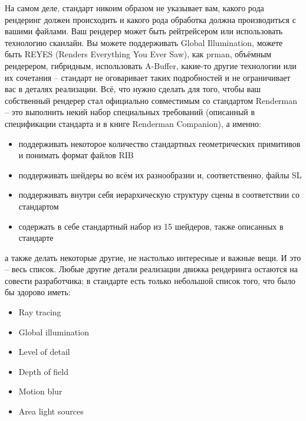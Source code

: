  На самом деле,  стандарт никоим образом не
    указывает вам, какого рода рендеринг должен происходить и какого
    рода обработка должна производиться с вашими файлами. Ваш рендерер
    может быть рейтрейсером или использовать технологию сканлайн. Вы
    можете поддерживать Global Illumination,
    можете быть REYES (Renders Everything You Ever Saw), как prman, объёмным рендерером, гибридным, использовать A-Buffer, какие-то
    другие технологии или их сочетания – стандарт не оговаривает таких
    подробностей и  не
    ограничивает вас в деталях реализации. Всё, что нужно сделать для
    того, чтобы ваш собственный рендерер стал официально совместимым со
    стандартом Renderman – это
    выполнить некий набор специальных требований (описанный в
    спецификации стандарта и в книге Renderman Companion), а
    именно:
  
\begin{itemize}

\item поддерживать некоторое количество стандартных геометрических примитивов и понимать формат файлов RIB

\item поддерживать шейдеры во всём их разнообразии и, соответственно, файлы SL

\item поддерживать внутри себя иерархическую структуру сцены в соответствии со стандартом

\item содержать в себе стандартный набор из 15 шейдеров, также описанных в стандарте 

\end{itemize}

 а также делать некоторые другие, не настолько
    интересные и важные вещи. И это – весь список. Любые другие детали
    реализации движка рендеринга остаются на совести разработчика; в
    стандарте есть только небольшой список того, что было бы здорово
    иметь:

\begin{itemize}
 \item     Ray tracing
 \item      Global illumination
 \item      Level of detail
\item      Depth of field
\item      Motion blur
\item      Area light sources
\end{itemize}

